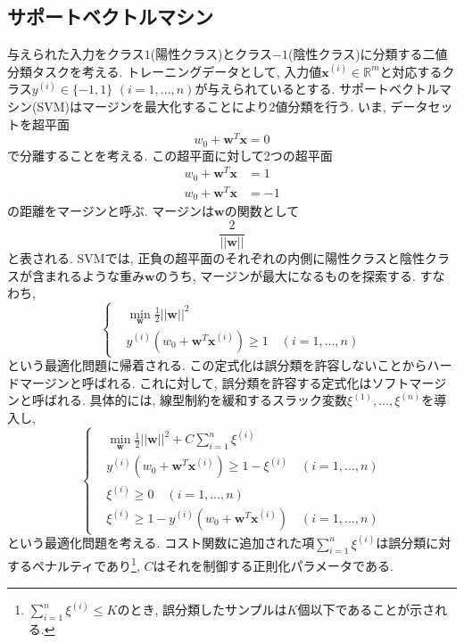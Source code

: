 \documentclass[uplatex]{jsarticle}
\theoremstyle{definition}
\numberwithin{equation}{section}
\newcommand{\R}{\mathbb{R}}
\newcommand{\norm}[1]{\left|\left|#1\right|\right|}
\begin{document}
\subsection{サポートベクトルマシン}
与えられた入力をクラス$1$(陽性クラス)とクラス$-1$(陰性クラス)に分類する二値分類タスクを考える.
トレーニングデータとして, 入力値$\bm{x}^{(i)} \in \R^{m}$と対応するクラス$y^{(i)} \in \{-1, 1\}$ $(i = 1, \dots, n)$が与えられているとする.
サポートベクトルマシン(SVM)はマージンを最大化することにより2値分類を行う.
いま, データセットを超平面
\begin{equation}
    w_{0} + \bm{w}^{T}\bm{x} = 0
\end{equation}
で分離することを考える.
この超平面に対して2つの超平面
\begin{align}
    w_{0} + \bm{w}^{T}\bm{x} &= 1 \\
    w_{0} + \bm{w}^{T}\bm{x} &= -1
\end{align}
の距離をマージンと呼ぶ.
マージンは$\bm{w}$の関数として
\begin{equation}
    \frac{2}{\norm{\bm{w}}}
\end{equation}
と表される.
SVMでは, 正負の超平面のそれぞれの内側に陽性クラスと陰性クラスが含まれるような重み$\bm{w}$のうち, マージンが最大になるものを探索する.
すなわち, 
\begin{equation}
    \left\{
        \begin{aligned}
            & \min_{\bm{w}} \frac{1}{2}\norm{\bm{w}}^{2} \\
            & y^{(i)}(w_{0} + \bm{w}^{T}\bm{x}^{(i)}) \geq 1 \quad (i = 1, \dots, n)
        \end{aligned}
    \right.
\end{equation}
という最適化問題に帰着される.
この定式化は誤分類を許容しないことからハードマージンと呼ばれる.
これに対して, 誤分類を許容する定式化はソフトマージンと呼ばれる.
具体的には, 線型制約を緩和するスラック変数$\xi^{(1)}, \dots, \xi^{(n)}$を導入し, 
\begin{equation}
    \left\{
        \begin{aligned}
            & \min_{\bm{w}} \frac{1}{2}\norm{\bm{w}}^{2} + C\sum_{i = 1}^{n} \xi^{(i)} \\
            & y^{(i)}(w_{0} + \bm{w}^{T}\bm{x}^{(i)}) \geq 1 - \xi^{(i)} \quad (i = 1, \dots, n) \\
            & \xi^{(i)} \geq 0 \quad (i = 1, \dots, n) \\
            & \xi^{(i)} \geq 1 - y^{(i)}(w_{0} + \bm{w}^{T}\bm{x}^{(i)}) \quad (i = 1, \dots, n)
        \end{aligned}
    \right.
\end{equation}
という最適化問題を考える.
コスト関数に追加された項$\sum_{i = 1}^{n} \xi^{(i)}$は誤分類に対するペナルティであり\footnote{$\sum_{i = 1}^{n} \xi^{(i)} \leq K$のとき, 誤分類したサンプルは$K$個以下であることが示される.}, $C$はそれを制御する正則化パラメータである.
\end{document}
